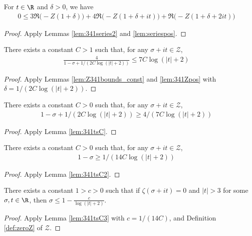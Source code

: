 \begin{lemma}\label{lem:341Zpos}  \leanok
For $t\in\R$ and $\delta>0$, we have
\begin{align*}
0\le 3\Re\big(-Z(1+\delta)\big) + 4\Re\big(-Z(1+\delta+it)\big) + \Re\big(-Z(1+\delta+2it)\big)
\end{align*}
\end{lemma}
\begin{proof} \leanok {}
Apply Lemmas \ref{lem:341series2} and \ref{lem:seriespos}.
\end{proof}


\begin{lemma}[Inequality]\label{lem:341tsC}  \leanok
There exists a constant $C>1$ such that, for any $\sigma +it\in \mathcal{Z}$,
\begin{align*}
\frac{4}{1-\sigma+1/(2C\log(|t|+2))}\le 7C\log(|t|+2)
\end{align*}
\end{lemma}
\begin{proof} \leanok {}
Apply Lemmas \ref{lem:Z341bounds_const} and \ref{lem:341Zpos} with $\delta  = 1/(2C\log(|t|+2))$.
\end{proof}

\begin{lemma}[Rearranged]\label{lem:341tsC2}  \leanok
There exists a constant $C>0$ such that, for any $\sigma +it\in \mathcal{Z}$,
\begin{align*}
1-\sigma+1/(2C\log(|t|+2)) \ge 4/(7C\log(|t|+2))
\end{align*}
\end{lemma}
\begin{proof}    
Apply Lemma \ref{lem:341tsC}. \leanok
\end{proof}

\begin{lemma}\label{lem:341tsC3}  \leanok
There exists a constant $C>0$ such that, for any $\sigma +it\in \mathcal{Z}$,
\begin{align*}
1-\sigma \ge 1/(14C\log(|t|+2))
\end{align*}
\end{lemma}
\begin{proof} \leanok {}
Apply Lemma \ref{lem:341tsC2}.
\end{proof}


\begin{lemma}\label{lem:zerofree}  \leanok
There exists a constant $1>c>0$ such that if $\zeta(\sigma+it)=0$ and $|t|>3$ for some $\sigma,t\in\R$, then $\sigma \le 1 - \frac{c}{\log(|t|+2)}$.
\end{lemma}
\begin{proof} 
\leanok
Apply Lemma \ref{lem:341tsC3} with $c=1/(14C)$, and Definition \ref{def:zeroZ} of $\mathcal{Z}$.
\end{proof}


